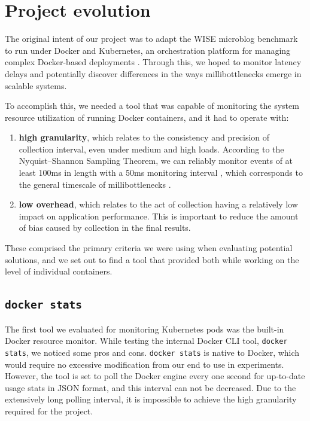 \documentclass[a4paper,11pt]{article}
\newcommand{\granularitybf}{\textbf{high granularity}\xspace}
\newcommand{\overheadbf}{\textbf{low overhead}\xspace}
\newcommand{\dockerstats}{\texttt{docker stats}\xspace}
\begin{document}
\setlength\intextsep{1.2em}
\vspace{-0.28em}
\section{Project evolution}

The original intent of our project was to adapt the WISE microblog benchmark \cite{microblog} to run under Docker
and Kubernetes, an orchestration platform for managing complex Docker-based deployments \cite{Kubernetes}.
Through this, we hoped to monitor latency delays
and potentially discover differences in the ways millibottlenecks emerge in scalable systems. 

To accomplish this, we needed a tool that was capable of monitoring the system resource utilization
of running Docker containers, and it had to operate with:

\vspace{-0.18em}
\begin{enumerate}
    \item \granularitybf, which relates to the consistency and precision of collection interval,
    even under medium and high loads.
    According to the Nyquist–Shannon Sampling Theorem,
    we can reliably monitor events of at least 100ms in length with a 50ms monitoring interval \cite{SamplingTheorem},
    which corresponds to the general timescale of millibottlenecks \cite{Millibottleneck}.
    
    \item \overheadbf, which relates to the act of collection having a relatively low impact on application performance.
    This is important to reduce the amount of bias caused by collection in the final results.
\end{enumerate}
\vspace{-0.25em}

These comprised the primary criteria we were using when evaluating potential solutions,
and we set out to find a tool that provided both while working on the level of individual containers.

\subsection{\dockerstats}

The first tool we evaluated for monitoring Kubernetes pods was the built-in Docker resource monitor.
While testing the internal Docker CLI tool, \dockerstats, we noticed some pros and cons.
\dockerstats is native to Docker, which would require no excessive modification from our end to use in experiments.
However, the tool is set to poll the Docker engine every one second for up-to-date usage stats in JSON format,
and this interval can not be decreased.
Due to the extensively long polling interval, it is impossible to achieve the high granularity required for the project. 
\end{document}
